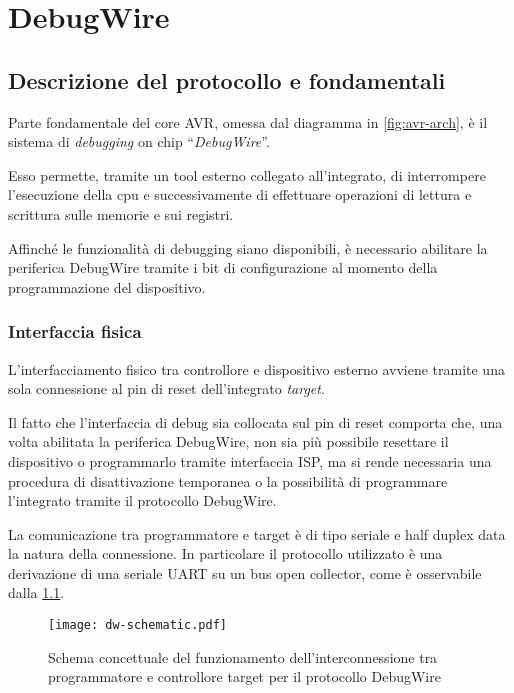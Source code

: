 \chapter{DebugWire}\label{chap:dw}
\section{Descrizione del protocollo e fondamentali}

Parte fondamentale del core AVR, omessa dal diagramma in \cref{fig:avr-arch}, è il sistema di \textit{debugging} on chip ``\textit{DebugWire}''.

Esso permette, tramite un tool esterno collegato all'integrato, di interrompere l'esecuzione della cpu e successivamente di effettuare operazioni di lettura e scrittura sulle memorie e sui registri.\cite[sec 25]{avr:m328p}

Affinché le funzionalità di debugging siano disponibili, è necessario abilitare la periferica DebugWire tramite i bit di configurazione al momento della programmazione del dispositivo\cite[tab 28-7]{avr:m328p}.

\subsection{Interfaccia fisica}\label{ss:dw-phy}

L'interfacciamento fisico tra controllore e dispositivo esterno avviene tramite una sola connessione al pin di reset dell'integrato \textit{target}.

Il fatto che l'interfaccia di debug sia collocata sul pin di reset comporta che, una volta abilitata la periferica DebugWire, non sia più possibile resettare il dispositivo o programmarlo tramite interfaccia ISP\cites{avr:appnote:isp}[sec 25.3]{avr:m328p}, ma si rende necessaria una procedura di disattivazione temporanea o la possibilità di programmare l'integrato tramite il protocollo DebugWire.

La comunicazione tra programmatore e target è di tipo seriale e half duplex data la natura della connessione. In particolare il protocollo utilizzato è una derivazione di una seriale UART su un bus open collector, come è osservabile dalla \cref{fig:dw-schematic}\cite{site:dw-reverse-engeneering}.

\begin{figure}[t]
    \centering
    \texttt{[image: dw-schematic.pdf]}
    \caption[]{Schema concettuale del funzionamento dell'interconnessione tra programmatore e controllore target per il protocollo DebugWire}\label{fig:dw-schematic}
\end{figure}

